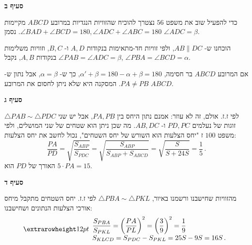 \textbf{סעיף ב}

כדי להפעיל שוב את משפט
$56$
נצטרך להוכיח שהזוויות הנגדיות במרובע
$ABCD$
מקיימות
$\angle BAD+\angle BCD=180, \angle ADC+\angle ABC=180$.
נסמן
$\angle ADC=\beta$.

הוכחנו ש-%
$AB\|DC$,
ולפי זוויות חד-מתאימות בנקודות
$A,D$
ו-%
$B,C$,
וזוויות משלימות בנקודות
$A,B$,
נקבל
$\angle PAB=\angle ADC=\beta$,
$\angle PBA=\angle BCD=\alpha$.

אם המרובע 
$ABCD$
בר חסימה,
$\alpha'+\beta=180-\alpha+\beta=180$,
כך ש-%
$\alpha=\beta$,
אבל נתון ש-%
$PA\neq PB$.
המסקנה היא שלא ניתן לחסום את המרובע
$ABCD$.

\vspace{2ex}

\textbf{סעיף ג}

$\triangle PAB \sim \triangle PDC$
לפי ז.ז. אולם, זה לא עוזר: אמנם נתון היחס בין
$PA,PB$,
אבל יש שני זוגות של נעלמים
$PD,PC$
ו-%
$AB,DC$.
מה שכן ניתן הוא שטחים של שני המושלים, ולפי משפט
$100$
ז "יחס הצלעות הוא השורש של יחס השטחים", נכול לחשב את יחס הצלעות:
\[
\frac{PA}{PD}=\sqrt{\frac{S_{ABP}}{S_{PDC}}} = \sqrt{\frac{S_{ABP}}{S_{ABP} + S_{ABCD}}}=\sqrt{\frac{S}{S+24S}}=\frac{1}{5}\,.
\]
האורך של 
$PD$
הוא
$5\cdot PA=15$.

\vspace{2ex}

\textbf{סעיף ד}

מהזוויות שחישבנו ורשמנו באיור,
$\triangle PBA \sim \triangle PKL$
לפי ז.ז. יחס השטחים מתקבל מיחס אורכי הצלעות הנתונים ושחישבנו:
\[
\erh{12pt}
\begin{array}{l}
\displaystyle\frac{S_{PBA}}{S_{PKL}}=\left(\frac{PA}{PL}\right)^2=\left(\frac{3}{9}\right)^2=\frac{1}{9}\\
S_{KLCD}=S_{PDC}-S_{PKL}=25S-9S=16S\,.
\end{array}
\]
\vspace{-3ex}
\begin{center}
\end{center}


